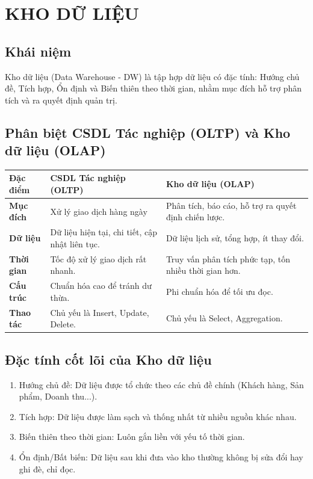 \section{KHO DỮ LIỆU}

\subsection{Khái niệm}
Kho dữ liệu (Data Warehouse - DW) là tập hợp dữ liệu có đặc tính: Hướng chủ đề, Tích hợp, Ổn định và Biến thiên theo thời gian, nhằm mục đích hỗ trợ phân tích và ra quyết định quản trị.

\subsection{Phân biệt CSDL Tác nghiệp (OLTP) và Kho dữ liệu (OLAP)}
\begin{table}[H]
    \centering
    \renewcommand{\arraystretch}{1.3}
    \begin{tabularx}{\textwidth}{|p{2.8cm}|X|X|}
        \hline
        \textbf{Đặc điểm} & \textbf{CSDL Tác nghiệp (OLTP)} & \textbf{Kho dữ liệu (OLAP)} \\
        \hline
        \textbf{Mục đích} & Xử lý giao dịch hàng ngày & Phân tích, báo cáo, hỗ trợ ra quyết định chiến lược. \\
        \hline
        \textbf{Dữ liệu} & Dữ liệu hiện tại, chi tiết, cập nhật liên tục. & Dữ liệu lịch sử, tổng hợp, ít thay đổi. \\
        \hline
        \textbf{Thời gian} & Tốc độ xử lý giao dịch rất nhanh. & Truy vấn phân tích phức tạp, tốn nhiều thời gian hơn. \\   
        \hline
        \textbf{Cấu trúc} & Chuẩn hóa cao để tránh dư thừa. & Phi chuẩn hóa để tối ưu đọc. \\
        \hline
        \textbf{Thao tác} & Chủ yếu là Insert, Update, Delete. & Chủ yếu là Select, Aggregation. \\
        \hline
    \end{tabularx}
\end{table}

\subsection{Đặc tính cốt lõi của Kho dữ liệu}
\begin{enumerate}
    \item Hướng chủ đề: Dữ liệu được tổ chức theo các chủ đề chính (Khách hàng, Sản phẩm, Doanh thu...).
    \item Tích hợp: Dữ liệu được làm sạch và thống nhất từ nhiều nguồn khác nhau.
    \item Biến thiên theo thời gian: Luôn gắn liền với yếu tố thời gian.
    \item Ổn định/Bất biến: Dữ liệu sau khi đưa vào kho thường không bị sửa đổi hay ghi đè, chỉ đọc.
\end{enumerate}

